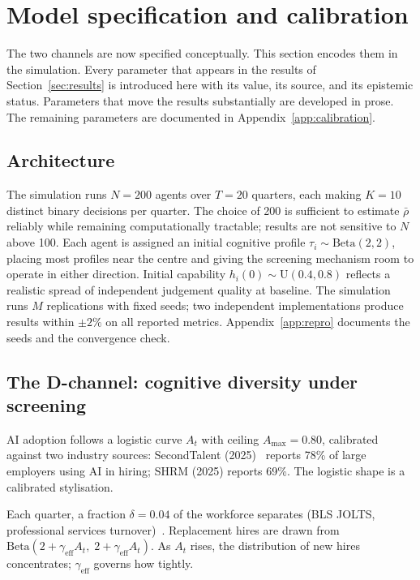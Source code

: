 \documentclass[11pt,a4paper]{article}
\begin{document}
\section{Model specification and calibration}\label{sec:model}

The two channels are now specified conceptually. This section encodes them
in the simulation. Every parameter that appears in the results of
Section~\ref{sec:results} is introduced here with its value, its source,
and its epistemic status. Parameters that move the results substantially are
developed in prose. The remaining parameters are documented in
Appendix~\ref{app:calibration}.

\subsection{Architecture}

The simulation runs $N = 200$ agents over $T = 20$ quarters, each making
$K = 10$ distinct binary decisions per quarter. The choice of 200 is
sufficient to estimate $\bar{\rho}$ reliably while remaining computationally
tractable; results are not sensitive to $N$ above 100. Each agent is assigned
an initial cognitive profile $\tau_i \sim \mathrm{Beta}(2,2)$, placing most
profiles near the centre and giving the screening mechanism room to operate
in either direction. Initial capability $h_i(0) \sim \mathrm{U}(0.4, 0.8)$
reflects a realistic spread of independent judgement quality at baseline. The
simulation runs $M$ replications with fixed seeds; two independent
implementations produce results within $\pm 2\%$ on all reported metrics.
Appendix~\ref{app:repro} documents the seeds and the convergence check.

\subsection{The D-channel: cognitive diversity under screening}

AI adoption follows a logistic curve $A_t$ with ceiling
$A_{\max} = 0.80$, calibrated against two industry sources: SecondTalent
(2025)~\cite{secondtalent_2025} reports 78\% of large employers using AI in hiring; SHRM (2025)
reports 69\%. The logistic shape is a calibrated stylisation.

Each quarter, a fraction $\delta = 0.04$ of the workforce separates (BLS
JOLTS, professional services turnover)~\cite{bls_jolts_2025,workinstitute_2020}. Replacement hires are drawn from
$\mathrm{Beta}(2 + \gamma_{\text{eff}} A_t,\;
2 + \gamma_{\text{eff}} A_t)$. As $A_t$ rises, the distribution of new
hires concentrates; $\gamma_{\text{eff}}$ governs how tightly.
\end{document}
